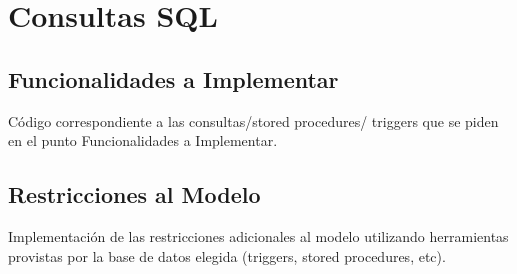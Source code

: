 \section{Consultas SQL}

\subsection{Funcionalidades a Implementar}
Código correspondiente a las consultas/stored procedures/ triggers que se piden en el punto Funcionalidades a Implementar.



\subsection{Restricciones al Modelo}
Implementación de las restricciones adicionales al modelo utilizando herramientas provistas por la base de datos elegida (triggers, stored procedures, etc).


